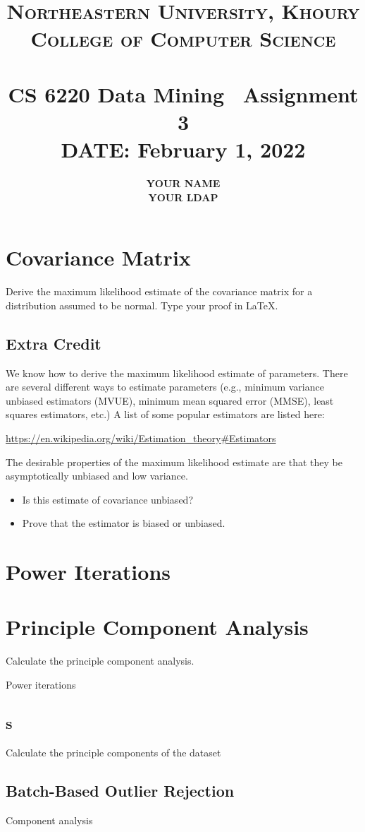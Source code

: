 \documentclass[paper=a4, fontsize=11pt]{scrartcl} %
\title{	
\normalfont \normalsize
\textsc{Northeastern University,  Khoury College of Computer Science} \\ [25pt] %
\horrule{0.5pt} \\[0.4cm] %
\huge CS 6220  Data Mining \textemdash~Assignment 3\\ %
\Large \textbf{DATE: February 1, 2022} %
\horrule{2pt} \\[0.5cm] %
}
\author{\textbf{YOUR NAME} \\ \textbf{YOUR LDAP}} %
\date{} %
\numberwithin{equation}{section} %
\numberwithin{figure}{section} %
\numberwithin{table}{section} %
\newcommand\AtPageUpperRight[1]{\AtPageUpperLeft{%
   \makebox[\paperwidth][r]{#1}}}
\begin{document}
\AddToShipoutPictureBG*{%
  \AtPageUpperRight{\raisebox{-\height}{\texttt{[image: images/logo]}}}}
\maketitle %

\section{Covariance Matrix}

Derive the maximum likelihood estimate of the covariance matrix for a distribution assumed to be normal. Type your proof in \LaTeX.


\subsection{Extra Credit}

We know how to derive the maximum likelihood estimate of parameters. There are several different ways to estimate parameters (e.g., minimum variance unbiased estimators (MVUE), minimum mean squared error (MMSE), least squares estimators, etc.) A list of some popular estimators are listed here:

\url{https://en.wikipedia.org/wiki/Estimation_theory#Estimators}

The desirable properties of the maximum likelihood estimate are that they be asymptotically unbiased and low variance.

\begin{itemize}
    \item Is this estimate of covariance unbiased?
    \item Prove that the estimator is biased or unbiased.
\end{itemize}

\section{Power Iterations}



\section{Principle Component Analysis}

Calculate the principle component analysis. 

Power iterations

\subsection{s}
Calculate the principle components of the dataset

\subsection{Batch-Based Outlier Rejection}

Component analysis
\end{document}
